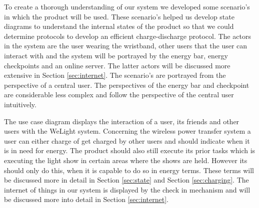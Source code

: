 %
To create a thorough understanding of our system we developed some scenario's in which the product will be used. These scenario's helped us develop state diagrams to understand the internal states of the product so that we could determine protocols to develop an efficient charge-discharge protocol. The actors in the system are the user wearing the wristband, other users that the user can interact with and the system will be portrayed by the energy bar, energy checkpoints and an online server. The latter actors will be discussed more extensive in Section \ref{sec:internet}. The scenario's are portrayed from the perspective of a central user. The perspectives of the energy bar and checkpoint are considerable less complex and follow the perspective of the central user intuitively. 

The use case diagram displays the interaction of a user, its friends and other users with the WeLight system. Concerning the wireless power transfer system a user can either charge of get charged by other users and should indicate when it is in need for energy. The product should also still execute its prior tasks which is executing the light show in certain areas where the shows are held. However its should only do this, when it is capable to do so in energy terms. These terms will be discussed more in detail in Section \ref{sec:state} and Section \ref{sec:charging}. The internet of things in our system is displayed by the check in mechanism and will be discussed more into detail in Section \ref{sec:internet}.

